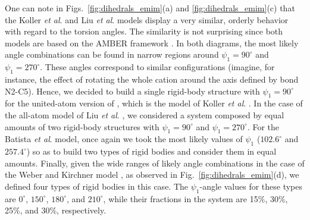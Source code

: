 \documentclass[3p,twocolumn]{elsarticle}
\begin{document}
One can note in Figs.~\ref{fig:dihedrals_emim}(a) and \ref{fig:dihedrals_emim}(c) that the Koller \textit{et al}. \cite{Koller_2012} and Liu \textit{et al}. \cite{Liu_2014} models display a very similar, orderly behavior with regard to the torsion angles.
The similarity is not surprising since both models are based on the AMBER framework \cite{Cornell_1995}.
In both diagrams, the most likely angle combinations can be found in narrow regions around $\psi_1 = 90^\circ$ and $\psi_1 = 270^\circ$.
These angles correspond to similar configurations (imagine, for instance, the effect of rotating the whole cation around the axis defined by bond N2-C5).
Hence, we decided to build a single rigid-body structure with $\psi_1 = 90^\circ$ for the united-atom version of \ce{[emim]^+}, which is the model of Koller \textit{et al}. \cite{Koller_2012}.
In the case of the all-atom model of Liu \textit{et al}. \cite{Liu_2014}, we considered a system composed by equal amounts of two rigid-body structures with $\psi_1 = 90^\circ$ and $\psi_1 = 270^\circ$.
For the Batista \textit{et al}. \cite{Batista_2015} model, once again we took the most likely values of $\psi_1$ ($102.6^\circ$ and $257.4^\circ$) so as to build two types of rigid bodies and consider them in equal amounts.
Finally, given the wide ranges of likely angle combinations in the case of the Weber and Kirchner model \cite{Weber_2016}, as observed in Fig.~\ref{fig:dihedrals_emim}(d), we defined four types of rigid bodies in this case.
The $\psi_1$-angle values for these types are $0^\circ$, $150^\circ$, $180^\circ$, and $210^\circ$, while their fractions in the system are 15\%, 30\%, 25\%, and 30\%, respectively.
\end{document}
